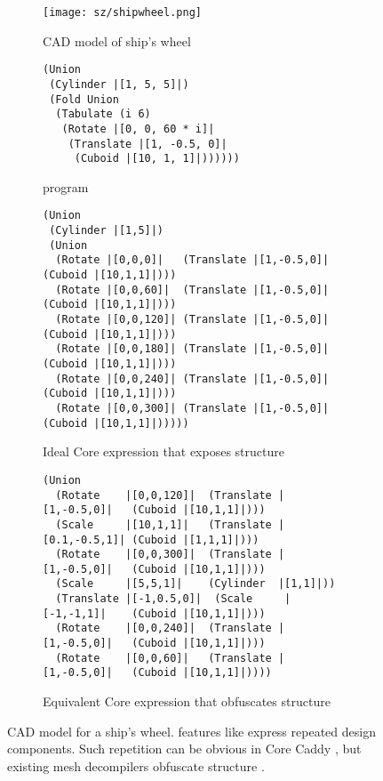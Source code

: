 \begin{figure}
  \begin{subfigure}[b]{0.48\linewidth}
    \centering
    \texttt{[image: sz/shipwheel.png]}
    \caption{CAD model of ship's wheel}
    \label{fig:ship-cad}
  \end{subfigure}
  \hfill
  \begin{subfigure}[b]{0.48\linewidth}
    \begin{lstlisting}[style=caddy, xleftmargin=10mm]
(Union
 (Cylinder |[1, 5, 5]|)
 (Fold Union
  (Tabulate (i 6)
   (Rotate |[0, 0, 60 * i]|
    (Translate |[1, -0.5, 0]|
     (Cuboid |[10, 1, 1]|))))))
    \end{lstlisting}
    \caption{\caddy program}
    \label{fig:ship-prog}
  \end{subfigure}
  \vspace{1em}

  \begin{subfigure}{\linewidth}
    \begin{lstlisting}[style=caddy, xleftmargin=25mm]
(Union
 (Cylinder |[1,5]|)
 (Union
  (Rotate |[0,0,0]|   (Translate |[1,-0.5,0]| (Cuboid |[10,1,1]|)))
  (Rotate |[0,0,60]|  (Translate |[1,-0.5,0]| (Cuboid |[10,1,1]|)))
  (Rotate |[0,0,120]| (Translate |[1,-0.5,0]| (Cuboid |[10,1,1]|)))
  (Rotate |[0,0,180]| (Translate |[1,-0.5,0]| (Cuboid |[10,1,1]|)))
  (Rotate |[0,0,240]| (Translate |[1,-0.5,0]| (Cuboid |[10,1,1]|)))
  (Rotate |[0,0,300]| (Translate |[1,-0.5,0]| (Cuboid |[10,1,1]|)))))
    \end{lstlisting}
    \caption{
      Ideal Core \caddy expression that exposes structure
    }\label{fig:ship-csg-good}
  \end{subfigure}
  \begin{subfigure}{\linewidth}
    \begin{lstlisting}[style=caddy, xleftmargin=20mm]
(Union
  (Rotate    |[0,0,120]|  (Translate |[1,-0.5,0]|   (Cuboid |[10,1,1]|)))
  (Scale     |[10,1,1]|   (Translate |[0.1,-0.5,1]| (Cuboid |[1,1,1]|)))
  (Rotate    |[0,0,300]|  (Translate |[1,-0.5,0]|   (Cuboid |[10,1,1]|)))
  (Scale     |[5,5,1]|    (Cylinder  |[1,1]|))
  (Translate |[-1,0.5,0]|  (Scale     |[-1,-1,1]|    (Cuboid |[10,1,1]|)))
  (Rotate    |[0,0,240]|  (Translate |[1,-0.5,0]|   (Cuboid |[10,1,1]|)))
  (Rotate    |[0,0,60]|   (Translate |[1,-0.5,0]|   (Cuboid |[10,1,1]|))))
    \end{lstlisting}
    \caption{
      Equivalent Core \caddy expression that obfuscates structure
    }\label{fig:ship-csg-bad}
  \end{subfigure}

  \caption{
     CAD model for a ship's wheel.
     \caddy features like \mapi express
      repeated design components.
    Such repetition can be obvious in
      Core Caddy ,
      but existing mesh decompilers
      obfuscate structure .
  }\label{fig:ship}
\end{figure}

